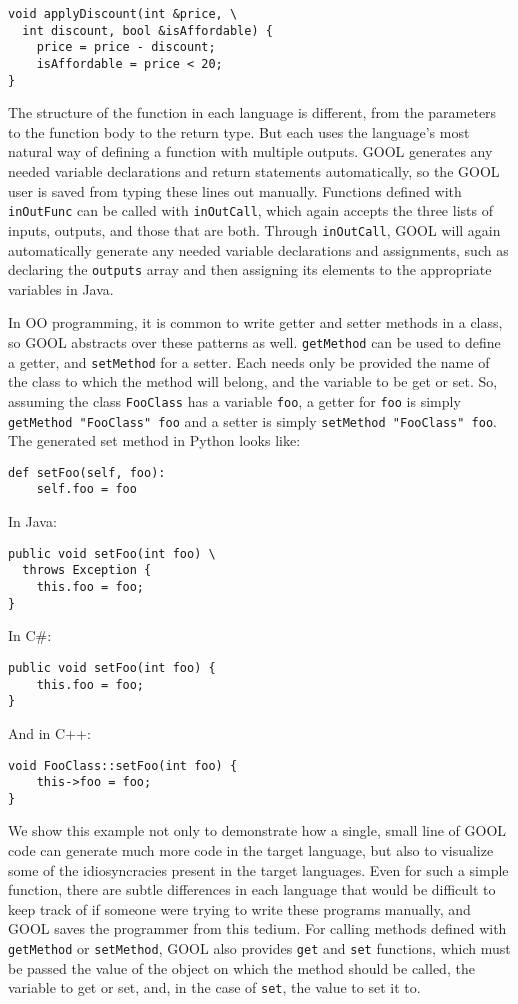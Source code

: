 \documentclass[sigplan,review,anonymous,prologue,dvipsnames]{acmart}
\begin{document}
\begin{lstlisting}
void applyDiscount(int &price, \
  int discount, bool &isAffordable) {
    price = price - discount;
    isAffordable = price < 20;
}
\end{lstlisting}
The structure of the function in each language is different, from the 
parameters to the function body to the return type. But each uses the 
language's most natural way of defining a function with multiple outputs. GOOL 
generates any needed variable declarations and return statements automatically, 
so the GOOL user is saved from typing these lines out manually. Functions 
defined with \verb|inOutFunc| can be called with \verb|inOutCall|, which again 
accepts the three lists of inputs, outputs, and those that are both. Through 
\verb|inOutCall|, GOOL will again automatically generate any needed variable 
declarations and assignments, such as declaring the \verb|outputs| array and 
then assigning its elements to the appropriate variables in Java.

In OO programming, it is common to write getter and setter methods in a class, 
so GOOL abstracts over these patterns as well. \verb|getMethod| can be used to 
define a getter, and \verb|setMethod| for a setter. Each needs only be provided 
the name of the class to which the method will belong, and the variable to be 
get or set. So, assuming the class \verb|FooClass| has a variable \verb|foo|, a 
getter for \verb|foo| is simply \verb|getMethod "FooClass" foo| and a setter is 
simply \verb|setMethod "FooClass" foo|. The generated set method in Python 
looks like:
\begin{lstlisting}
def setFoo(self, foo):
    self.foo = foo
\end{lstlisting}
In Java:
\begin{lstlisting}
public void setFoo(int foo) \
  throws Exception {
    this.foo = foo;
}
\end{lstlisting}
In C\#:
\begin{lstlisting}
public void setFoo(int foo) {
    this.foo = foo;
}
\end{lstlisting}
And in C++:
\begin{lstlisting}
void FooClass::setFoo(int foo) {
    this->foo = foo;
}
\end{lstlisting}
We show this example not only to demonstrate how a single, small line of GOOL 
code can generate much more code in the target language, but also to visualize 
some of the idiosyncracies present in the target languages. Even for such a 
simple function, there are subtle differences in each language that would be 
difficult to keep track of if someone were trying to write these programs 
manually, and GOOL saves the programmer from this tedium. For calling methods 
defined with \verb|getMethod| or \verb|setMethod|, GOOL also provides 
\verb|get| and \verb|set| functions, which must be passed the value of the 
object on which the method should be called, the variable to get or set, and, 
in the case of \verb|set|, the value to set it to.
\end{document}
